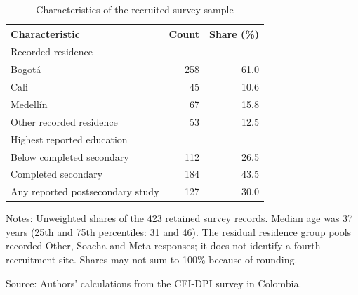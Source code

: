 \begin{table}[tbp]
\centering
\caption{Characteristics of the recruited survey sample}
\label{tab:academic-sample}
\begin{tabular}{@{}lrr@{}}
\toprule
Characteristic & Count & Share (\%) \\
\midrule
Recorded residence & & \\
\quad Bogotá & 258 & 61.0 \\
\quad Cali & 45 & 10.6 \\
\quad Medellín & 67 & 15.8 \\
\quad Other recorded residence & 53 & 12.5 \\
\addlinespace
Highest reported education & & \\
\quad Below completed secondary & 112 & 26.5 \\
\quad Completed secondary & 184 & 43.5 \\
\quad Any reported postsecondary study & 127 & 30.0 \\
\bottomrule
\end{tabular}
\par\smallskip
\begin{minipage}{0.90\linewidth}
\footnotesize\raggedright
Notes: Unweighted shares of the 423 retained survey records. Median age was 37 years (25th and 75th percentiles: 31 and 46). The residual residence group pools recorded Other, Soacha and Meta responses; it does not identify a fourth recruitment site. Shares may not sum to 100\% because of rounding.\par
Source: Authors' calculations from the CFI-DPI survey in Colombia.
\end{minipage}
\end{table}
